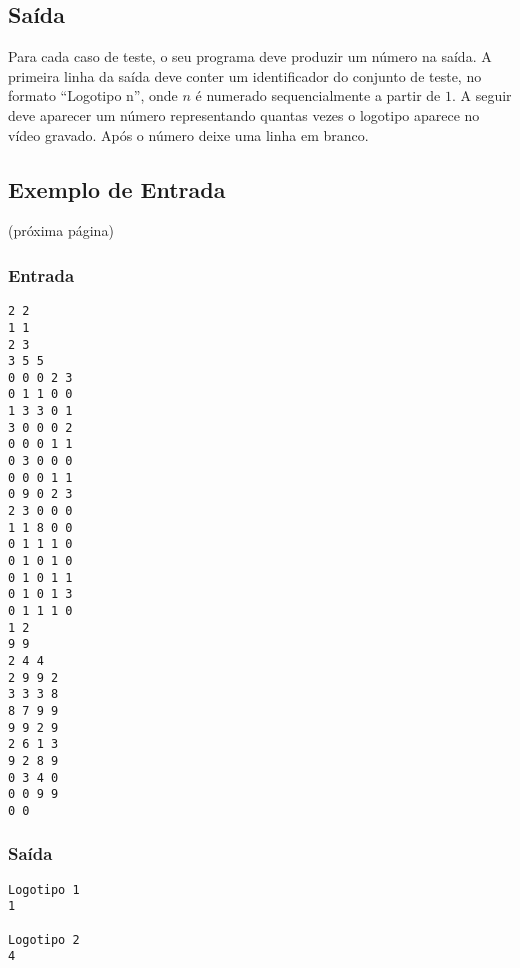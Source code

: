 \subsection*{Saída}

Para cada caso de teste, o seu programa deve produzir um número na saída. A primeira linha da saída deve conter um identificador do conjunto de teste, no formato “Logotipo n”, onde $n$ é numerado sequencialmente a partir de $1$. A seguir deve aparecer um número representando quantas vezes o logotipo aparece no vídeo gravado. Após o número deixe uma linha em branco.

\subsection*{Exemplo de Entrada}
(próxima página)

\newpage
\begin{multicols}{2}
\subsubsection*{Entrada}
\begin{verbatim}
2 2
1 1
2 3
3 5 5
0 0 0 2 3
0 1 1 0 0
1 3 3 0 1
3 0 0 0 2
0 0 0 1 1
0 3 0 0 0
0 0 0 1 1
0 9 0 2 3
2 3 0 0 0
1 1 8 0 0
0 1 1 1 0
0 1 0 1 0
0 1 0 1 1
0 1 0 1 3
0 1 1 1 0
1 2
9 9
2 4 4
2 9 9 2
3 3 3 8
8 7 9 9
9 9 2 9
2 6 1 3
9 2 8 9
0 3 4 0
0 0 9 9
0 0
\end{verbatim}
\columnbreak
\subsubsection*{Saída}
\begin{verbatim}
Logotipo 1
1

Logotipo 2
4

\end{verbatim}
\end{multicols}
